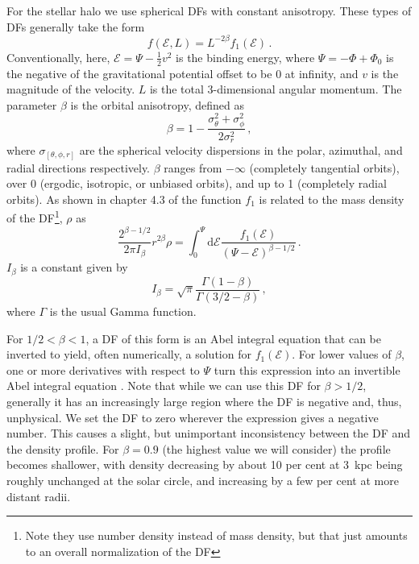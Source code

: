 For the stellar halo we use spherical DFs with constant anisotropy. These types of DFs generally take the form
\begin{equation}
    f(\mathcal{E},L) = L^{-2\beta} f_{1}(\mathcal{E})\,.
\end{equation}
Conventionally, here, $\mathcal{E} = \Psi-\frac{1}{2}v^{2}$ is the binding energy, where $\Psi = -\Phi+\Phi_{0}$ is the negative of the gravitational potential offset to be 0 at infinity, and $v$ is the magnitude of the velocity. $L$ is the total 3-dimensional angular momentum. The parameter $\beta$ is the orbital anisotropy, defined as
\begin{equation}
    \beta = 1- \frac{\sigma^{2}_{\theta} + \sigma^{2}_{\phi}}{2\sigma^{2}_{r}}\,,
\end{equation}
where $\sigma_{[\theta,\phi,r]}$ are the spherical velocity dispersions in the polar, azimuthal, and radial directions respectively. $\beta$ ranges from $-\infty$ (completely tangential orbits), over 0 (ergodic, isotropic, or unbiased orbits), and up to 1 (completely radial orbits). As shown in chapter 4.3 of \textcite{binney08} the function $f_{1}$ is related to the mass density of the DF\footnote{Note they use number density instead of mass density, but that just amounts to an overall normalization of the DF}, $\rho$ as
\begin{equation}
    \label{ch2:eq:AbelIntegral}
    \frac{ 2^{\beta-1/2} }{ 2\pi I_{\beta} } r^{2\beta}\rho = \int_{0}^{\Psi} \mathrm{d}\mathcal{E} \frac{ f_{1}(\mathcal{E}) }{ (\Psi-\mathcal{E})^{\beta-1/2} }\,.
\end{equation}
$I_{\beta}$ is a constant given by
\begin{equation}
    I_{\beta} = \sqrt{\pi}\frac{\Gamma(1-\beta)}{\Gamma(3/2-\beta)}\,,
\end{equation}
where $\Gamma$ is the usual Gamma function.

For $1/2 < \beta < 1$, a DF of this form is an Abel integral equation that can be inverted to yield, often numerically, a solution for $f_{1}(\mathcal{E})$. For lower values of $\beta$, one or more derivatives with respect to $\Psi$ turn this expression into an invertible Abel integral equation \parencite{cuddeford91}. Note that while we can use this DF for $\beta > 1/2$, generally it has an increasingly large region where the DF is negative and, thus, unphysical. We set the DF to zero wherever the expression gives a negative number. This causes a slight, but unimportant inconsistency between the DF and the density profile. For $\beta=0.9$ (the highest value we will consider) the profile becomes shallower, with density decreasing by about 10 per cent at 3~kpc being roughly unchanged at the solar circle, and increasing by a few per cent at more distant radii.

